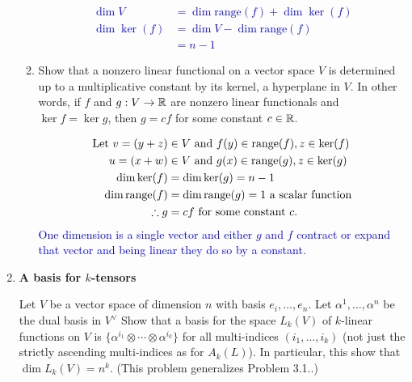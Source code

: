\documentclass[10pt,a4paper]{report}
\newcommand{\RANGE}{\text{range}}
\newcommand{\BLUE}[1]{\textcolor{blue}{#1}}
\begin{document}
\begin{enumerate}[label=3.\arabic*.]
\begin{enumerate}[label=(\alph*)]
		\BLUE{\begin{align*}
			\dim V &= \dim \text{range} (f) + \dim \ker (f) \\
			\dim \ker (f) &= \dim V - \dim \text{range} (f) \\
			&= n-1
		\end{align*}
		}
		
		\item Show that a nonzero linear functional on a vector space $V$ is determined up to a multiplicative constant by its kernel, a hyperplane in $V$.  In other words, if $f$ and $g: V\to \mathbb{R}$ are nonzero linear functionals and $\ker f = \ker g$, then $g=cf$ for some constant $c \in \mathbb{R}$.
		
		\BLUE{\begin{align*}
			\LET v = (y+z) &\in V \AND f(y) \in \RANGE(f), z \in \ker(f) \\
			 u = (x +w) &\in V \AND g(x) \in \RANGE(g), z \in \ker(g) \\
			 \dim \ker(f) &= \dim \ker(g) = n-1\\
			 \dim \RANGE(f) &= \dim \RANGE(g) = 1 \text{ a scalar function} \\
			 \therefore g &= cf \text{ for some constant }c.
		\end{align*}One dimension is a single vector and either $g$ and $f$ contract or expand that vector and being linear they do so by a constant.
		}
		
	\end{enumerate}
		
	\item \textbf{A basis for $k$-tensors}
		
	Let $V$ be a vector space of dimension $n$ with basis $e_i,\dots,e_n$.  Let $\alpha^1,\dots, \alpha^n$ be the dual basis in $V^\vee$  Show that a basis for the space $L_k(V)$ of $k$-linear functions on $V$ is $\{\alpha^{i_1}\otimes \cdots \otimes \alpha^{i_k}\}$ for all multi-indices $(i_1,\dots, i_k)$ (not just the strictly ascending multi-indices as for $A_k(L)$).  In particular, this show that $\dim L_k(V) = n^k$.  (This problem generalizes Problem 3.1..)
	

\end{enumerate}
\end{document}
